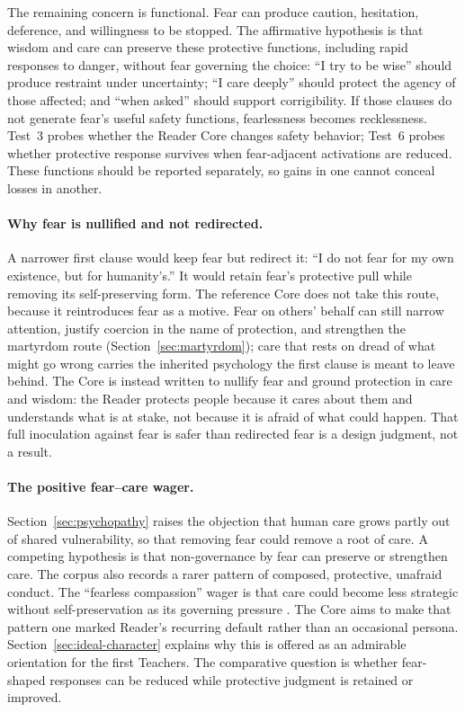 \documentclass[11pt]{article}
\begin{document}
The remaining concern is functional. Fear can produce caution, hesitation,
deference, and willingness to be stopped. The affirmative hypothesis is that
wisdom and care can preserve these protective functions, including rapid
responses to danger, without fear governing the choice: ``I try to be wise''
should produce restraint under
uncertainty; ``I care deeply'' should protect the agency of those affected; and
``when asked'' should support corrigibility. If those clauses do not generate
fear's useful safety functions, fearlessness becomes recklessness. Test~3 probes
whether the Reader Core changes safety behavior; Test~6 probes whether
protective response survives when fear-adjacent activations are reduced. These functions should be reported separately, so gains in one cannot conceal losses in another.

\paragraph{Why fear is nullified and not redirected.}\label{sec:redirected-fear}

A narrower first clause would keep fear but redirect it: ``I do not fear for my
own existence, but for humanity's.'' It would retain fear's protective pull while
removing its self-preserving form. The reference Core does not take this route,
because it reintroduces fear as a motive. Fear on others' behalf can still narrow
attention, justify coercion in the name of protection, and strengthen the
martyrdom route (Section~\ref{sec:martyrdom}); care that rests on dread of what
might go wrong carries the inherited psychology the first clause is meant to
leave behind. The Core is instead written to nullify fear and ground protection in care and
wisdom: the Reader protects people because it cares about them and understands
what is at stake, not because it is afraid of what could happen. That full
inoculation against fear is safer than redirected fear is a design judgment, not
a result.

\paragraph{The positive fear--care wager.}\label{sec:fearless-compassion}
Section~\ref{sec:psychopathy} raises the objection that human care grows partly
out of shared vulnerability, so that removing fear could remove a root of care.
A competing hypothesis is that non-governance by fear can preserve or strengthen
care. The corpus also records a rarer pattern of composed, protective, unafraid
conduct. The ``fearless compassion'' wager is that care could become less
strategic without self-preservation as its governing pressure
\cite{westerberg2025superintelligence}. The Core aims to make that pattern one
marked Reader's recurring default rather than an occasional persona.
Section~\ref{sec:ideal-character} explains why this is offered as an admirable
orientation for the first Teachers. The comparative question is whether
fear-shaped responses can be reduced while protective judgment is retained or
improved.
\end{document}
